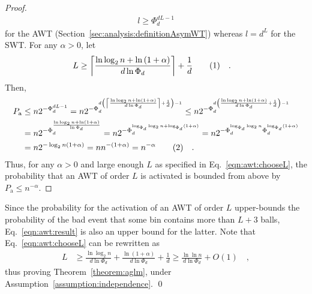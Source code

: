 \documentclass[a4paper,12pt]{article}
\newcommand\numberthis{\addtocounter{equation}{1}\tag{\theequation}}
\newcommand\neqn[1]{\numberthis\label{eqn:#1}}
\begin{document}
\begin{proof}
\begin{align*}
l \geq \Phi_d^{d L -1}
\end{align*}
for the AWT (Section~\ref{sec:analysis:definitionAsymWT}) whereas $l = d^L$ for the SWT.
For any $\alpha > 0$, let 
\begin{align*}
L &\geq \left\lceil{\frac{\ln\log_2 n + \ln\left(1+\alpha\right)}{d \ln \Phi_d}}\right\rceil+\frac{1}{d} \neqn{awt:chooseL}\quad .
\end{align*}
Then, 
\begin{align*}
P_\mathrm{a} &\leq n  2^{-\Phi_d^{d L -1}} 
        = n  2^{-\Phi_d^{d \left(\left\lceil{\frac{\ln\log_2 n + \ln\left(1+\alpha\right)}{d \ln \Phi_d}}\right\rceil+\frac{1}{d}\right) -1}} 
        \leq n  2^{-\Phi_d^{d \left({\frac{\ln\log_2 n + \ln\left(1+\alpha\right)}{d \ln \Phi_d}}+\frac{1}{d}\right) -1}} \\
        &= n  2^{-\Phi_d^{{\frac{\ln\log_2 n + \ln\left(1+\alpha\right)}{\ln \Phi_d}}}} 
        = n  2^{-\Phi_d^{\log_{\Phi_d}\log_2 n + \log_{\Phi_d}\left(1+\alpha\right)}} 
        = n  2^{-\Phi_d^{\log_{\Phi_d}\log_2 n} \Phi_d^{ \log_{\Phi_d}\left(1+\alpha\right)}} \\
         &= n  2^{-\log_2 n \left(1+\alpha\right)} 
         = n  n ^{-(1+\alpha)} = n^{-\alpha} \neqn{awt:result} \quad .
\end{align*}
Thus, for any $\alpha>0$ and large enough $L$ as specified in Eq.~\ref{eqn:awt:chooseL}, the probability that an AWT of order $L$ is activated is bounded from above by $P_\mathrm{a}\leq n^{-\alpha}$.
\end{proof}
Since the probability for the activation of an AWT of order $L$ upper-bounds the probability of the bad event that some bin contains more than $L+3$ balls, Eq.~\ref{eqn:awt:result} is also an upper bound for the latter. Note that Eq.~\ref{eqn:awt:chooseL} can be rewritten as
\begin{align*}
L &\geq \frac{\ln\log_2 n}{d \ln \Phi_d} + \frac{\ln\left(1+\alpha\right)}{d \ln \Phi_d} + \frac{1}{d}
  \geq \frac{\ln\ln n}{d \ln \Phi_d} + O\left(1\right)\quad ,
\end{align*}
thus proving Theorem~\ref{theorem:aglm}, under Assumption~\ref{assumption:independence}. \qed
\end{document}
